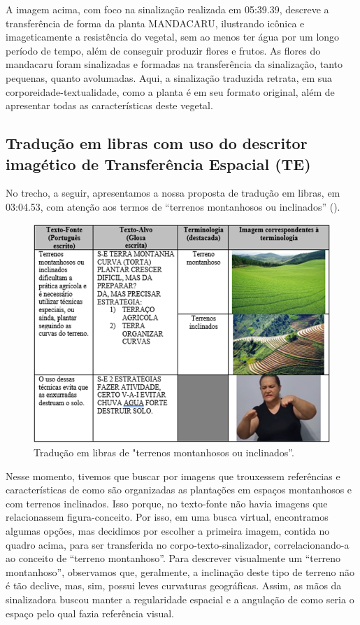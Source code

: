 \documentclass[portuguese]{textolivre}
\begin{document}
A imagem acima, com foco na sinalização realizada em 05:39.39, descreve a transferência de forma da planta MANDACARU, ilustrando icônica e imageticamente a resistência do vegetal, sem ao menos ter água por um longo período de tempo, além de conseguir produzir flores e frutos. As flores do mandacaru foram sinalizadas e formadas na transferência da sinalização, tanto pequenas, quanto avolumadas. Aqui, a sinalização traduzida retrata, em sua corporeidade-textualidade, como a planta é em seu formato original, além de apresentar todas as características deste vegetal. 

\subsection{Tradução em libras com uso do descritor imagético de Transferência Espacial (TE)}\label{sec-organizacao}
No trecho, a seguir, apresentamos a nossa proposta de tradução em libras, em 03:04.53, com atenção aos termos de “terrenos montanhosos ou inclinados” ().

\begin{figure}[h!]
    \centering
    \begin{minipage}{0.85\linewidth}
    \includegraphics[width=\linewidth]{Fig7.png}
    \caption{Tradução em libras de "terrenos montanhosos ou inclinados”.}
    \label{fig7}
     \end{minipage}
\end{figure}

Nesse momento, tivemos que buscar por imagens que trouxessem referências e características de como são organizadas as plantações em espaços montanhosos e com terrenos inclinados. Isso porque, no texto-fonte não havia imagens que relacionassem figura-conceito. Por isso, em uma busca virtual, encontramos algumas opções, mas decidimos por escolher a primeira imagem, contida no quadro acima,  para ser transferida no corpo-texto-sinalizador, correlacionando-a ao conceito de “terreno montanhoso”. Para descrever visualmente um “terreno montanhoso”, observamos que, geralmente, a inclinação deste tipo de terreno não é tão declive, mas, sim, possui leves curvaturas geográficas. Assim, as mãos da sinalizadora buscou manter a regularidade espacial e a angulação de como seria o espaço pelo qual fazia referência visual.
\end{document}
